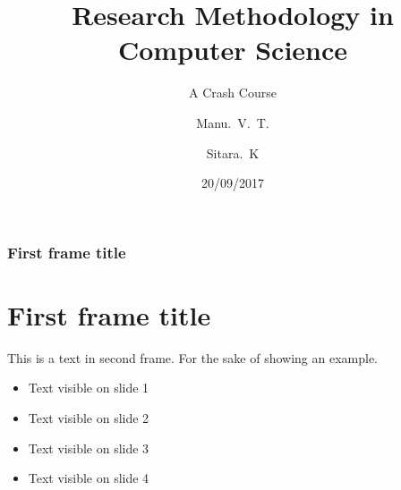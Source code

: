 \documentclass{beamer}
\title{Research Methodology in Computer Science}
\subtitle{A Crash Course}
\author{Manu.~V.~T.\inst{1} \and Sitara.~K\inst{2}}
\institute[VFU] %
{
	\inst{1}%
	IDRBT\\
	Hyderabad
	\and
	\inst{2}%
	SCIS\\
	University of Hyderabad
}
\date{20/09/2017}
\begin{document}
	\frame{\titlepage}
%
	\begin{frame}
	\frametitle{First frame title}
	\section{First frame title}
	This is a text in second frame. 
	For the sake of showing an example.
	
	\begin{itemize}
		\item<1-> Text visible on slide 1
		\item<2-> Text visible on slide 2
		\item<3-> Text visible on slide 3
		\item<4-> Text visible on slide 4
	\end{itemize}
	
	\end{frame}
	
\end{document}
